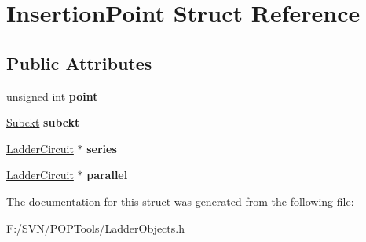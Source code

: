 \hypertarget{struct_insertion_point}{\section{Insertion\-Point Struct Reference}
\label{struct_insertion_point}
}
\subsection*{Public Attributes}
\begin{DoxyCompactItemize}
\item 
\hypertarget{struct_insertion_point_aa99d688ee66586eca63cc342d09a3108}{unsigned int {\bfseries point}}\label{struct_insertion_point_aa99d688ee66586eca63cc342d09a3108}

\item 
\hypertarget{struct_insertion_point_a5f2a724fc6bb6d13c2ece84d5e09c3d4}{\hyperlink{struct_subckt}{Subckt} {\bfseries subckt}}\label{struct_insertion_point_a5f2a724fc6bb6d13c2ece84d5e09c3d4}

\item 
\hypertarget{struct_insertion_point_a209dd4ba9be92b5dad1cab5cddda3763}{\hyperlink{class_ladder_circuit}{Ladder\-Circuit} $\ast$ {\bfseries series}}\label{struct_insertion_point_a209dd4ba9be92b5dad1cab5cddda3763}

\item 
\hypertarget{struct_insertion_point_ae8dae4baf6734111f448bcda10079219}{\hyperlink{class_ladder_circuit}{Ladder\-Circuit} $\ast$ {\bfseries parallel}}\label{struct_insertion_point_ae8dae4baf6734111f448bcda10079219}

\end{DoxyCompactItemize}


The documentation for this struct was generated from the following file\-:\begin{DoxyCompactItemize}
\item 
F\-:/\-S\-V\-N/\-P\-O\-P\-Tools/Ladder\-Objects.\-h\end{DoxyCompactItemize}
